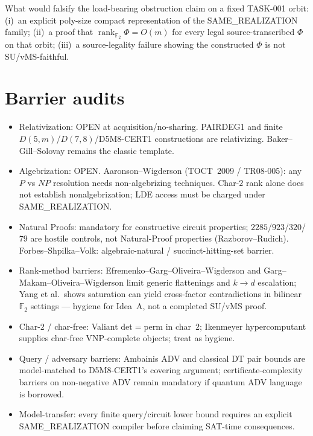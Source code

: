 \documentclass[11pt]{article}
\begin{document}
What would falsify the load-bearing obstruction claim on a fixed TASK-001 orbit:
(i)~an explicit poly-size compact representation of the SAME\_REALIZATION family;
(ii)~a proof that $\operatorname{rank}_{\mathbb F_2}\Phi=O(m)$ for every legal
source-transcribed $\Phi$ on that orbit; (iii)~a source-legality failure showing
the constructed $\Phi$ is not SU/vMS-faithful.

\section*{Barrier audits}
\begin{itemize}
\item Relativization: OPEN at acquisition/no-sharing. PAIRDEG1 and finite
$D(5,m)$/$D(7,8)$/D5M8-CERT1 constructions are relativizing.
Baker--Gill--Solovay remains the classic template.
\item Algebrization: OPEN. Aaronson--Wigderson (TOCT~2009 / TR08-005): any
$P$ vs $NP$ resolution needs non-algebrizing techniques. Char-$2$ rank alone does
not establish nonalgebrization; LDE access must be charged under SAME\_REALIZATION.
\item Natural Proofs: mandatory for constructive circuit properties; $2285$/$923$/$320$/$79$
are hostile controls, not Natural-Proof properties (Razborov--Rudich).
Forbes--Shpilka--Volk: algebraic-natural / succinct-hitting-set barrier.
\item Rank-method barriers: Efremenko--Garg--Oliveira--Wigderson and
Garg--Makam--Oliveira--Wigderson limit generic flattenings and $k\to d$ escalation;
Yang et al.\ shows saturation can yield cross-factor contradictions in bilinear
$\mathbb F_2$ settings --- hygiene for Idea~A, not a completed SU/vMS proof.
\item Char-$2$ / char-free: Valiant det$=$perm in char~$2$; Ikenmeyer hypercomputant
supplies char-free VNP-complete objects; treat as hygiene.
\item Query / adversary barriers: Ambainis ADV and classical DT pair bounds are
model-matched to D5M8-CERT1's covering argument; certificate-complexity barriers
on non-negative ADV remain mandatory if quantum ADV language is borrowed.
\item Model-transfer: every finite query/circuit lower bound requires an explicit
SAME\_REALIZATION compiler before claiming SAT-time consequences.
\end{itemize}
\end{document}
